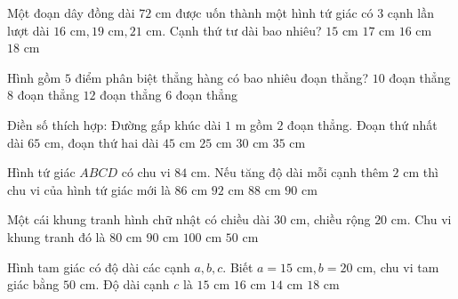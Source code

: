 \begin{ex} %
Một đoạn dây đồng dài $72\text{ cm}$ được uốn thành một hình tứ giác có $3$ cạnh lần lượt dài $16\text{ cm}, 19\text{ cm}, 21\text{ cm}$. Cạnh thứ tư dài bao nhiêu?
\choice
{$15\text{ cm}$}
{$17\text{ cm}$}
{\True $16\text{ cm}$}
{$18\text{ cm}$}
\end{ex}

\begin{ex} %
Hình gồm $5$ điểm phân biệt thẳng hàng có bao nhiêu đoạn thẳng?
\choice
{\True $10$ đoạn thẳng}
{$8$ đoạn thẳng}
{$12$ đoạn thẳng}
{$6$ đoạn thẳng}
\end{ex}

\begin{ex} %
Điền số thích hợp: Đường gấp khúc dài $1\text{ m}$ gồm $2$ đoạn thẳng. Đoạn thứ nhất dài $65\text{ cm}$, đoạn thứ hai dài
\choice
{$45\text{ cm}$}
{$25\text{ cm}$}
{$30\text{ cm}$}
{\True $35\text{ cm}$}
\end{ex}

\begin{ex} %
Hình tứ giác $ABCD$ có chu vi $84\text{ cm}$. Nếu tăng độ dài mỗi cạnh thêm $2\text{ cm}$ thì chu vi của hình tứ giác mới là
\choice
{$86\text{ cm}$}
{\True $92\text{ cm}$}
{$88\text{ cm}$}
{$90\text{ cm}$}
\end{ex}

\begin{ex} %
Một cái khung tranh hình chữ nhật có chiều dài $30\text{ cm}$, chiều rộng $20\text{ cm}$. Chu vi khung tranh đó là
\choice
{$80\text{ cm}$}
{$90\text{ cm}$}
{\True $100\text{ cm}$}
{$50\text{ cm}$}
\end{ex}

\begin{ex} %
Hình tam giác có độ dài các cạnh $a, b, c$. Biết $a = 15\text{ cm}, b = 20\text{ cm}$, chu vi tam giác bằng $50\text{ cm}$. Độ dài cạnh $c$ là
\choice
{\True $15\text{ cm}$}
{$16\text{ cm}$}
{$14\text{ cm}$}
{$18\text{ cm}$}
\end{ex}


